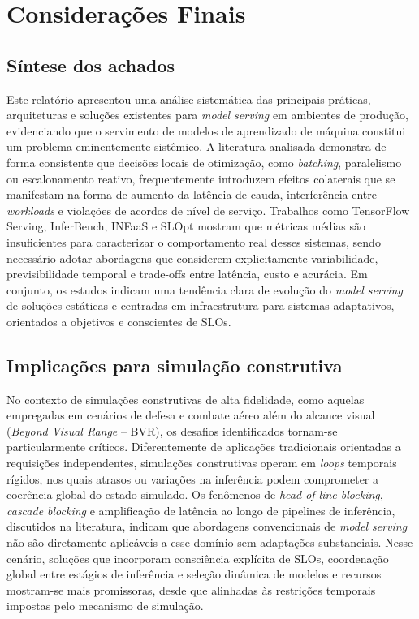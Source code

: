 \section{Considerações Finais}

\subsection{Síntese dos achados}

Este relatório apresentou uma análise sistemática das principais práticas, arquiteturas e soluções existentes para \emph{model serving} em ambientes de produção, evidenciando que o servimento de modelos de aprendizado de máquina constitui um problema eminentemente sistêmico. A literatura analisada demonstra de forma consistente que decisões locais de otimização, como \emph{batching}, paralelismo ou escalonamento reativo, frequentemente introduzem efeitos colaterais que se manifestam na forma de aumento da latência de cauda, interferência entre \emph{workloads} e violações de acordos de nível de serviço. Trabalhos como TensorFlow Serving, InferBench, INFaaS e SLOpt mostram que métricas médias são insuficientes para caracterizar o comportamento real desses sistemas, sendo necessário adotar abordagens que considerem explicitamente variabilidade, previsibilidade temporal e trade-offs entre latência, custo e acurácia. Em conjunto, os estudos indicam uma tendência clara de evolução do \emph{model serving} de soluções estáticas e centradas em infraestrutura para sistemas adaptativos, orientados a objetivos e conscientes de SLOs.

\subsection{Implicações para simulação construtiva}

No contexto de simulações construtivas de alta fidelidade, como aquelas empregadas em cenários de defesa e combate aéreo além do alcance visual (\emph{Beyond Visual Range} -- BVR), os desafios identificados tornam-se particularmente críticos. Diferentemente de aplicações tradicionais orientadas a requisições independentes, simulações construtivas operam em \emph{loops} temporais rígidos, nos quais atrasos ou variações na inferência podem comprometer a coerência global do estado simulado. Os fenômenos de \emph{head-of-line blocking}, \emph{cascade blocking} e amplificação de latência ao longo de pipelines de inferência, discutidos na literatura, indicam que abordagens convencionais de \emph{model serving} não são diretamente aplicáveis a esse domínio sem adaptações substanciais. Nesse cenário, soluções que incorporam consciência explícita de SLOs, coordenação global entre estágios de inferência e seleção dinâmica de modelos e recursos mostram-se mais promissoras, desde que alinhadas às restrições temporais impostas pelo mecanismo de simulação.

